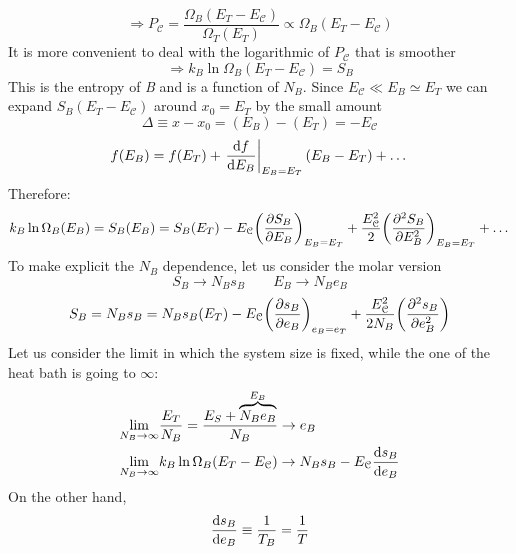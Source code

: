 \documentclass[../../Main/Main.tex]{subfiles}
\begin{document}
\begin{equation}
  \Rightarrow   P_{\mathcal{C} }= \frac{\Omega _B (E_T - E_{\mathcal{C} })}{\Omega _T (E_T)} \propto \Omega _B (E_T - E_{\mathcal{C} })
\end{equation}
It is more convenient to deal with the logarithmic of \( P_{\mathcal{C} } \) that is smoother
\begin{equation}
  \Rightarrow k_B \ln{\Omega _B (E_T - E_{\mathcal{C} })} = S_B
\end{equation}
This is the entropy of \emph{B} and is a function of \( N_B \). Since \( E_{\mathcal{C}} \ll E_B \simeq E_T \) we can expand \( S_B (E_T - E_{\mathcal{C} }) \) around \( x_0 = E_T \) by the small amount
\begin{equation*}
  \Delta \equiv x-x_0 = (E_B) - (E_T) = - E_{\mathcal{C} }
\end{equation*}
\begin{equation*}
  f(E_B) = f(E_T) +  \eval{\dv{f}{E_B}}_{E_B = E_T} (E_B-E_T) + \dots
\end{equation*}
Therefore:
\begin{equation}
  k_B \ln{\Omega _B (E_B) } = S_B (E_B) = S_B (E_T) - E_{\mathcal{C} } \qty(\pdv{S_B}{E_B} )_{E_B = E_T} + \frac{E^2_{\mathcal{C} }}{2} \qty( \pdv[2]{S_B}{E_B} )_{E_B =E_T} + \dots
\end{equation}
To make explicit the \( N_B \) dependence, let us consider the molar version
\begin{equation*}
  S_B \rightarrow N_B s_B \qquad
  E_B \rightarrow N_B e_B
\end{equation*}
\begin{equation*}
  S_B =  N_B s_B = N_B s_B (E_T) - E_{\mathcal{C}} \qty(\pdv{s_B}{e_B} )_{e_B=e_T} + \frac{E_{\mathcal{C}}^2}{2 N_B}  \qty(\pdv[2]{s_B}{e_B} )
\end{equation*}
Let us consider the limit in which the system size is fixed, while the one of the heat bath is going to \( \infty  \):
\begin{subequations}
\begin{align}
  \lim_{N_B \rightarrow \infty } & \frac{E_T}{N_B} = \frac{E_S+ 
  \overbrace{N_B e_B}^{E_B}}{N_B} \rightarrow e_B \\
  \lim_{N_B \rightarrow \infty } & k_B \ln{\Omega _B (E_T - E_{\mathcal{C}})} \rightarrow N_B s_B - E_{\mathcal{C}} \dv{s_B}{e_B}
\end{align}
\end{subequations}
On the other hand,
\begin{equation*}
  \dv{s_B}{e_B} \equiv \frac{1}{T_B} = \frac{1}{T}
\end{equation*}
\end{document}
